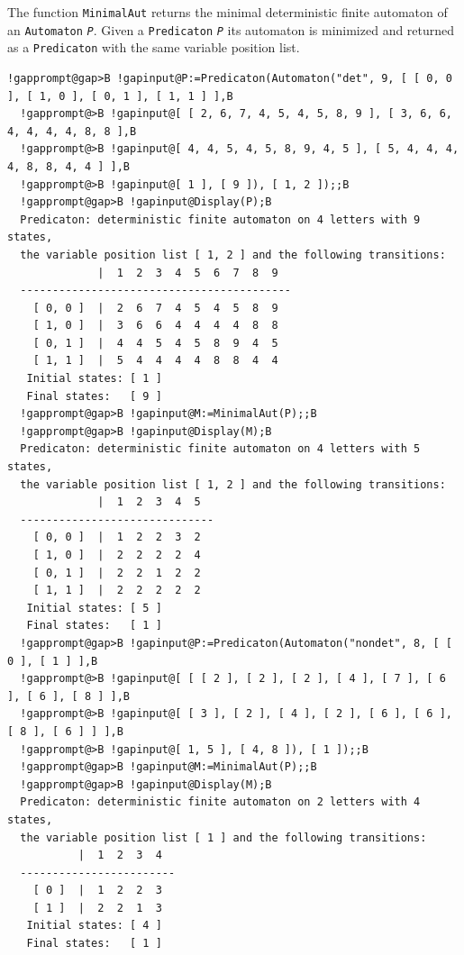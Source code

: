 \documentclass[a4paper,11pt]{report}
\begin{document}
{{{ The function \texttt{MinimalAut} returns the minimal deterministic finite automaton of an \texttt{Automaton} \mbox{\texttt{\mdseries\slshape P}}. Given a \texttt{Predicaton} \mbox{\texttt{\mdseries\slshape P}} its automaton is minimized and returned as a \texttt{Predicaton} with the same variable position list. 
\begin{Verbatim}[commandchars=!@B,fontsize=\small,frame=single,label=Example]
  !gapprompt@gap>B !gapinput@P:=Predicaton(Automaton("det", 9, [ [ 0, 0 ], [ 1, 0 ], [ 0, 1 ], [ 1, 1 ] ],B
  !gapprompt@>B !gapinput@[ [ 2, 6, 7, 4, 5, 4, 5, 8, 9 ], [ 3, 6, 6, 4, 4, 4, 4, 8, 8 ],B
  !gapprompt@>B !gapinput@[ 4, 4, 5, 4, 5, 8, 9, 4, 5 ], [ 5, 4, 4, 4, 4, 8, 8, 4, 4 ] ],B
  !gapprompt@>B !gapinput@[ 1 ], [ 9 ]), [ 1, 2 ]);;B
  !gapprompt@gap>B !gapinput@Display(P);B
  Predicaton: deterministic finite automaton on 4 letters with 9 states, 
  the variable position list [ 1, 2 ] and the following transitions:
              |  1  2  3  4  5  6  7  8  9  
  ------------------------------------------
    [ 0, 0 ]  |  2  6  7  4  5  4  5  8  9  
    [ 1, 0 ]  |  3  6  6  4  4  4  4  8  8  
    [ 0, 1 ]  |  4  4  5  4  5  8  9  4  5  
    [ 1, 1 ]  |  5  4  4  4  4  8  8  4  4  
   Initial states: [ 1 ]
   Final states:   [ 9 ]
  !gapprompt@gap>B !gapinput@M:=MinimalAut(P);;B
  !gapprompt@gap>B !gapinput@Display(M);B
  Predicaton: deterministic finite automaton on 4 letters with 5 states, 
  the variable position list [ 1, 2 ] and the following transitions:
              |  1  2  3  4  5  
  ------------------------------
    [ 0, 0 ]  |  1  2  2  3  2  
    [ 1, 0 ]  |  2  2  2  2  4  
    [ 0, 1 ]  |  2  2  1  2  2  
    [ 1, 1 ]  |  2  2  2  2  2  
   Initial states: [ 5 ]
   Final states:   [ 1 ]
  !gapprompt@gap>B !gapinput@P:=Predicaton(Automaton("nondet", 8, [ [ 0 ], [ 1 ] ],B
  !gapprompt@>B !gapinput@[ [ [ 2 ], [ 2 ], [ 2 ], [ 4 ], [ 7 ], [ 6 ], [ 6 ], [ 8 ] ],B
  !gapprompt@>B !gapinput@[ [ 3 ], [ 2 ], [ 4 ], [ 2 ], [ 6 ], [ 6 ], [ 8 ], [ 6 ] ] ],B
  !gapprompt@>B !gapinput@[ 1, 5 ], [ 4, 8 ]), [ 1 ]);;B
  !gapprompt@gap>B !gapinput@M:=MinimalAut(P);;B
  !gapprompt@gap>B !gapinput@Display(M);B
  Predicaton: deterministic finite automaton on 2 letters with 4 states, 
  the variable position list [ 1 ] and the following transitions:
           |  1  2  3  4  
  ------------------------
    [ 0 ]  |  1  2  2  3  
    [ 1 ]  |  2  2  1  3  
   Initial states: [ 4 ]
   Final states:   [ 1 ]
\end{Verbatim}
 }

 

}}
\end{document}
